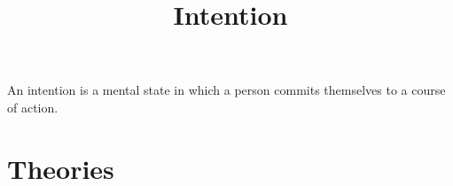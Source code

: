 \documentclass[a4paper]{article}
\title{Intention}
\date{}
\begin{document}
\maketitle
    An intention is a mental state in which a person commits themselves to a course of action. 
    
    \section{Theories}
\end{document}

